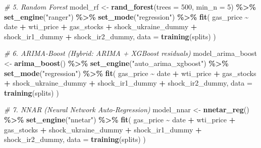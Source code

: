 \documentclass[
]{article}
\newenvironment{Shaded}{\begin{snugshade}}{\end{snugshade}}
\newcommand{\AttributeTok}[1]{\textcolor[rgb]{0.13,0.29,0.53}{#1}}
\newcommand{\CommentTok}[1]{\textcolor[rgb]{0.56,0.35,0.01}{\textit{#1}}}
\newcommand{\DecValTok}[1]{\textcolor[rgb]{0.00,0.00,0.81}{#1}}
\newcommand{\FunctionTok}[1]{\textcolor[rgb]{0.13,0.29,0.53}{\textbf{#1}}}
\newcommand{\NormalTok}[1]{#1}
\newcommand{\OtherTok}[1]{\textcolor[rgb]{0.56,0.35,0.01}{#1}}
\newcommand{\SpecialCharTok}[1]{\textcolor[rgb]{0.81,0.36,0.00}{\textbf{#1}}}
\newcommand{\StringTok}[1]{\textcolor[rgb]{0.31,0.60,0.02}{#1}}
\begin{document}
\begin{Shaded}
\begin{Highlighting}[]
\CommentTok{\# 5. Random Forest}
\NormalTok{model\_rf }\OtherTok{\textless{}{-}} \FunctionTok{rand\_forest}\NormalTok{(}\AttributeTok{trees =} \DecValTok{500}\NormalTok{, }\AttributeTok{min\_n =} \DecValTok{5}\NormalTok{) }\SpecialCharTok{\%\textgreater{}\%}
  \FunctionTok{set\_engine}\NormalTok{(}\StringTok{"ranger"}\NormalTok{) }\SpecialCharTok{\%\textgreater{}\%}
  \FunctionTok{set\_mode}\NormalTok{(}\StringTok{"regression"}\NormalTok{) }\SpecialCharTok{\%\textgreater{}\%}
  \FunctionTok{fit}\NormalTok{(}
\NormalTok{    gas\_price }\SpecialCharTok{\textasciitilde{}}\NormalTok{ date }\SpecialCharTok{+}\NormalTok{ wti\_price }\SpecialCharTok{+}\NormalTok{ gas\_stocks }\SpecialCharTok{+}
\NormalTok{      shock\_ukraine\_dummy }\SpecialCharTok{+}\NormalTok{ shock\_ir1\_dummy }\SpecialCharTok{+}\NormalTok{ shock\_ir2\_dummy,}
    \AttributeTok{data =} \FunctionTok{training}\NormalTok{(splits)}
\NormalTok{  )}

\CommentTok{\# 6. ARIMA{-}Boost (Hybrid: ARIMA + XGBoost residuals)}
\NormalTok{model\_arima\_boost }\OtherTok{\textless{}{-}} \FunctionTok{arima\_boost}\NormalTok{() }\SpecialCharTok{\%\textgreater{}\%}
  \FunctionTok{set\_engine}\NormalTok{(}\StringTok{"auto\_arima\_xgboost"}\NormalTok{) }\SpecialCharTok{\%\textgreater{}\%}
  \FunctionTok{set\_mode}\NormalTok{(}\StringTok{"regression"}\NormalTok{) }\SpecialCharTok{\%\textgreater{}\%}
  \FunctionTok{fit}\NormalTok{(}
\NormalTok{    gas\_price }\SpecialCharTok{\textasciitilde{}}\NormalTok{ date }\SpecialCharTok{+}\NormalTok{ wti\_price }\SpecialCharTok{+}\NormalTok{ gas\_stocks }\SpecialCharTok{+}
\NormalTok{      shock\_ukraine\_dummy }\SpecialCharTok{+}\NormalTok{ shock\_ir1\_dummy }\SpecialCharTok{+}\NormalTok{ shock\_ir2\_dummy,}
    \AttributeTok{data =} \FunctionTok{training}\NormalTok{(splits)}
\NormalTok{  )}

\CommentTok{\# 7. NNAR (Neural Network Auto{-}Regression)}
\NormalTok{model\_nnar }\OtherTok{\textless{}{-}} \FunctionTok{nnetar\_reg}\NormalTok{() }\SpecialCharTok{\%\textgreater{}\%}
  \FunctionTok{set\_engine}\NormalTok{(}\StringTok{"nnetar"}\NormalTok{) }\SpecialCharTok{\%\textgreater{}\%}
  \FunctionTok{fit}\NormalTok{(}
\NormalTok{    gas\_price }\SpecialCharTok{\textasciitilde{}}\NormalTok{ date }\SpecialCharTok{+}\NormalTok{ wti\_price }\SpecialCharTok{+}\NormalTok{ gas\_stocks }\SpecialCharTok{+}
\NormalTok{      shock\_ukraine\_dummy }\SpecialCharTok{+}\NormalTok{ shock\_ir1\_dummy }\SpecialCharTok{+}\NormalTok{ shock\_ir2\_dummy,}
    \AttributeTok{data =} \FunctionTok{training}\NormalTok{(splits)}
\NormalTok{  )}
\end{Highlighting}
\end{Shaded}
\end{document}
